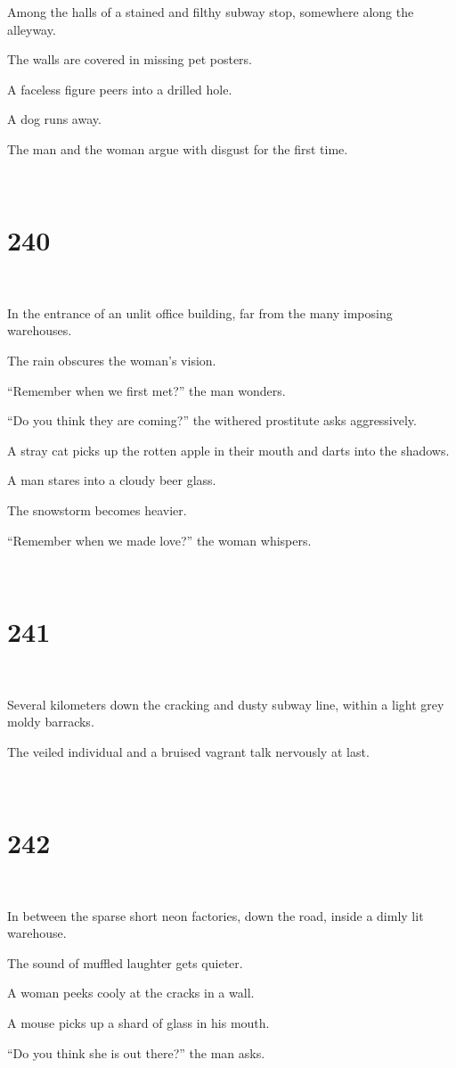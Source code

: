 \documentclass{report}
\begin{document}
Among the halls of a stained and filthy subway stop, somewhere along the alleyway.

The walls are covered in missing pet posters.

A faceless figure peers into a drilled hole.

A dog runs away.

The man and the woman argue with disgust for the first time.

~
\chapter*{240}
~

In the entrance of an unlit office building, far from the many imposing warehouses.

The rain obscures the woman's vision.

``Remember when we first met?'' the man wonders.

``Do you think they are coming?'' the withered prostitute asks aggressively.

A stray cat picks up the rotten apple in their mouth and darts into the shadows.

A man stares into a cloudy beer glass.

The snowstorm becomes heavier.

``Remember when we made love?'' the woman whispers.

~
\chapter*{241}
~

Several kilometers down the cracking and dusty subway line, within a light grey moldy barracks.

The veiled individual and a bruised vagrant talk nervously at last.

~
\chapter*{242}
~

In between the sparse short neon factories, down the road, inside a dimly lit warehouse.

The sound of muffled laughter gets quieter.

A woman peeks cooly at the cracks in a wall.

A mouse picks up a shard of glass in his mouth.

``Do you think she is out there?'' the man asks.
\end{document}
